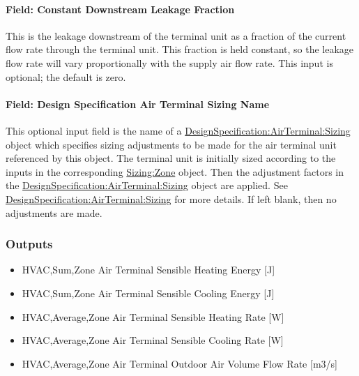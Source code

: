 \paragraph{Field: Constant Downstream Leakage Fraction}\label{field-constant-downstream-leakage-fraction}

This is the leakage downstream of the terminal unit as a fraction of the current flow rate through the terminal unit. This fraction is held constant, so the leakage flow rate will vary proportionally with the supply air flow rate. This input is optional; the default is zero.

\paragraph{Field: Design Specification Air Terminal Sizing Name}\label{design-specification-air-terminal-sizing-name2}

This optional input field is the name of a \hyperref[designspecificationairterminalsizing]{DesignSpecification:AirTerminal:Sizing} object which specifies sizing adjustments to be made for the air terminal unit referenced by this object. The terminal unit is initially sized according to the inputs in the corresponding \hyperref[sizingzone]{Sizing:Zone} object. Then the adjustment factors in the \hyperref[designspecificationairterminalsizing]{DesignSpecification:AirTerminal:Sizing} object are applied. See \hyperref[designspecificationairterminalsizing]{DesignSpecification:AirTerminal:Sizing} for more details. If left blank, then no adjustments are made.

\subsubsection{Outputs}

\begin{itemize}
    \item
    HVAC,Sum,Zone Air Terminal Sensible Heating Energy {[}J{]}
    \item
    HVAC,Sum,Zone Air Terminal Sensible Cooling Energy {[}J{]}
    \item
    HVAC,Average,Zone Air Terminal Sensible Heating Rate {[}W{]}
    \item
    HVAC,Average,Zone Air Terminal Sensible Cooling Rate {[}W{]}
    \item
    HVAC,Average,Zone Air Terminal Outdoor Air Volume Flow Rate {[}m3/s{]}
\end{itemize}

